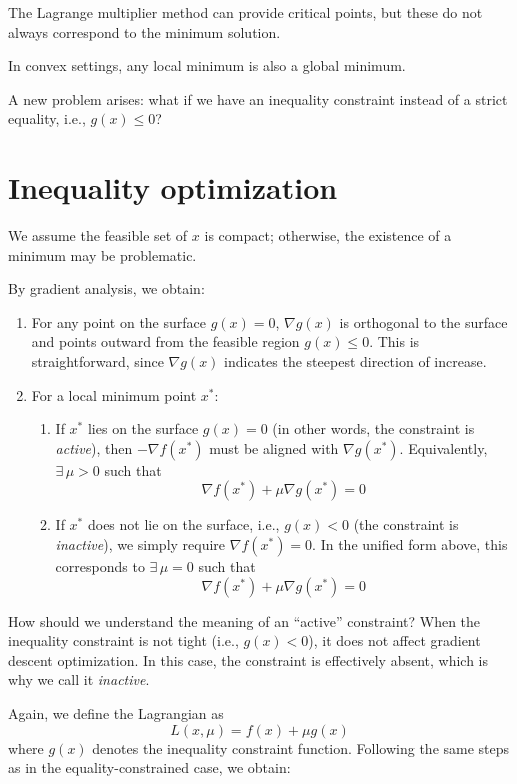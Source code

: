 \documentclass[../main]{subfiles}
\begin{document}
\begin{note}
    The Lagrange multiplier method can provide critical points, but these do not always correspond to the minimum solution.
\end{note}

\begin{note}
    In convex settings, any local minimum is also a global minimum.
\end{note}
\vspace{0.5em}
A new problem arises: what if we have an inequality constraint instead of a strict equality, i.e., $g(x) \leq 0$?

\section{Inequality optimization}
    We assume the feasible set of $x$ is compact; otherwise, the existence of a minimum may be problematic.

By gradient analysis, we obtain:
\begin{enumerate}
    \item For any point on the surface $g(x)=0$, $\nabla g(x)$ is orthogonal to the surface and points outward from the feasible region $g(x)\leq 0$.  
    This is straightforward, since $\nabla g(x)$ indicates the steepest direction of increase.
    \item For a local minimum point $x^*$:
    \begin{enumerate}
        \item If $x^*$ lies on the surface $g(x)=0$ (in other words, the constraint is \emph{active}), then $-\nabla f(x^*)$ must be aligned with $\nabla g(x^*)$.  
        Equivalently, $\exists \,\mu > 0$ such that 
        \[
            \nabla f(x^*) + \mu \nabla g(x^*) = 0
        \]
        \item If $x^*$ does not lie on the surface, i.e., $g(x)<0$ (the constraint is \emph{inactive}), we simply require $\nabla f(x^*)=0$.  
        In the unified form above, this corresponds to $\exists \,\mu=0$ such that 
        \[
            \nabla f(x^*) + \mu \nabla g(x^*) = 0
        \]
    \end{enumerate}
\end{enumerate}

\begin{note}
    How should we understand the meaning of an ``active'' constraint?  
    When the inequality constraint is not tight (i.e., $g(x)<0$), it does not affect gradient descent optimization.  
    In this case, the constraint is effectively absent, which is why we call it \emph{inactive}.
\end{note}
Again, we define the Lagrangian as
\begin{equation}
    L(x, \mu) = f(x) + \mu g(x)
\end{equation}
where $g(x)$ denotes the inequality constraint function.  
Following the same steps as in the equality-constrained case, we obtain:
\end{document}
